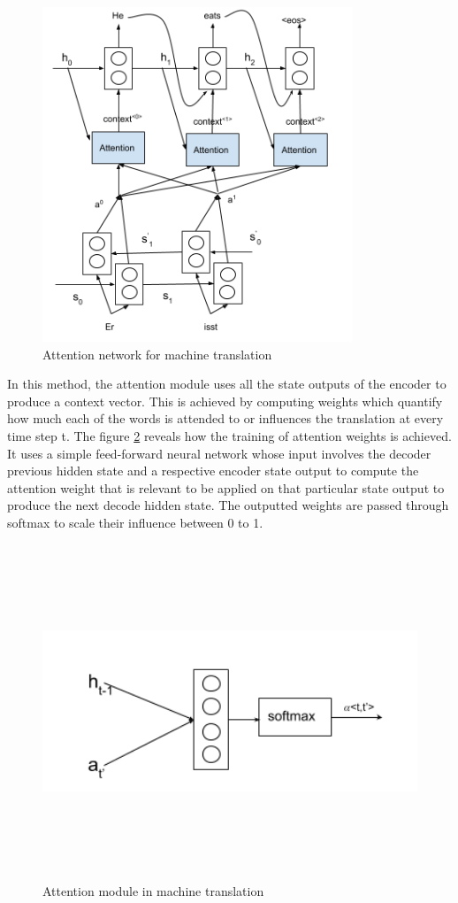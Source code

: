 \documentclass[a4paper, 11pt]{article}
\begin{document}
\begin{figure}[H]
    \centering
    \includegraphics[width=\textwidth,height=10cm,keepaspectratio=true]
    {attention-networks-1.png}
    \caption{
        Attention network for machine translation 
    }
    \label{fig:attention-networks-1}
\end{figure}

In this method, the attention module uses all the state outputs of the encoder to produce a context vector. This is achieved by computing weights which quantify how much each of the words is attended to or influences the translation at every time step t.  The figure \ref{fig:attention-networks-2} reveals how the training of attention weights is achieved. It uses a simple feed-forward neural network whose input involves the decoder previous hidden state and a respective encoder state output to compute the attention weight that is relevant to be applied on that particular state output to produce the next decode hidden state. The outputted weights are passed through softmax to scale their influence between 0 to 1.

\begin{figure}[H]
    \centering
    \includegraphics[width=\textwidth,height=10cm,keepaspectratio=true]
    {attention-networks-2.png}
    \caption{
        Attention module in machine translation 
    }
    \label{fig:attention-networks-2}
\end{figure}
\end{document}
